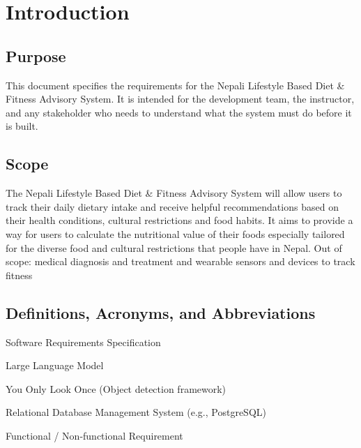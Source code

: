 \documentclass[11pt,a4paper]{article}
\begin{document}
\clearpage
\tableofcontents
\clearpage

\section{Introduction}

\subsection{Purpose}
This document specifies the requirements for the Nepali Lifestyle Based Diet & Fitness Advisory
System. It is intended for the development team, the instructor, and any stakeholder who needs to
understand what the system must do before it is built.

\subsection{Scope}
The Nepali Lifestyle Based Diet & Fitness Advisory System will allow users to track their daily dietary
intake and receive helpful recommendations based on their health conditions, cultural restrictions and
food habits. It aims to provide a way for users to calculate the nutritional value of their foods especially
tailored for the diverse food and cultural restrictions that people have in Nepal. Out of scope: medical
diagnosis and treatment and wearable sensors and devices to track fitness

\subsection{Definitions, Acronyms, and Abbreviations}
\begin{description}[leftmargin=2.5cm,style=nextline]
  \item[SRS] Software Requirements Specification
  \item[LLM] Large Language Model
  \item[YOLO] You Only Look Once (Object detection framework)
  \item[RDBMS] Relational Database Management System (e.g., PostgreSQL)
  \item[FR / NFR] Functional / Non-functional Requirement
\end{description}
\end{document}
